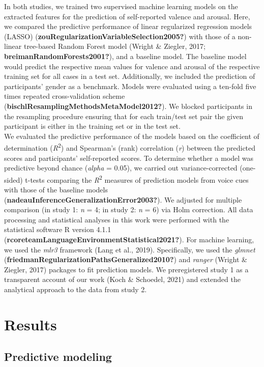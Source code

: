 \documentclass[
  english,
  man,floatsintext]{apa6}
\begin{document}
In both studies, we trained two supervised machine learning models on the extracted features for the prediction of self-reported valence and arousal. Here, we compared the predictive performance of linear regularized regression models (LASSO) (\textbf{zouRegularizationVariableSelection2005?}) with those of a non-linear tree-based Random Forest model (Wright \& Ziegler, 2017; \textbf{breimanRandomForests2001?}), and a baseline model. The baseline model would predict the respective mean values for valence and arousal of the respective training set for all cases in a test set. Additionally, we included the prediction of participants' gender as a benchmark. Models were evaluated using a ten-fold five times repeated cross-validation scheme (\textbf{bischlResamplingMethodsMetaModel2012?}). We blocked participants in the resampling procedure ensuring that for each train/test set pair the given participant is either in the training set or in the test set.\\
We evaluated the predictive performance of the models based on the coefficient of determination (\emph{R}\textsuperscript{2}) and Spearman's (rank) correlation (\emph{r}) between the predicted scores and participants' self-reported scores. To determine whether a model was predictive beyond chance (\emph{alpha} = 0.05), we carried out variance-corrected (one-sided) t-tests comparing the \emph{R}\textsuperscript{2} measures of prediction models from voice cues with those of the baseline models (\textbf{nadeauInferenceGeneralizationError2003?}). We adjusted for multiple comparison (in study 1: \emph{n} = 4; in study 2: \emph{n} = 6) via Holm correction.
All data processing and statistical analyses in this work were performed with the statistical software R version 4.1.1 (\textbf{rcoreteamLanguageEnvironmentStatistical2021?}). For machine learning, we used the \emph{mlr3} framework (Lang et al., 2019). Specifically, we used the \emph{glmnet} (\textbf{friedmanRegularizationPathsGeneralized2010?}) and \emph{ranger} (Wright \& Ziegler, 2017) packages to fit prediction models. We preregistered study 1 as a transparent account of our work (Koch \& Schoedel, 2021) and extended the analytical approach to the data from study 2.

\hypertarget{results}{%
\section{Results}\label{results}}

\hypertarget{predictive-modeling}{%
\subsection{Predictive modeling}\label{predictive-modeling}}
\end{document}
